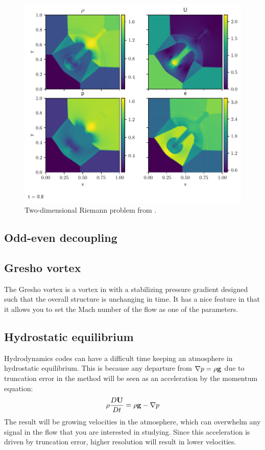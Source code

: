 \begin{figure}[t]
\centering
\includegraphics[width=0.85\linewidth]{quad}
\caption{\label{fig:Euler:quad} Two-dimensional Riemann problem
from \cite{hydro_test_quad}.}
\end{figure}

\ifdefined \debugmode
\subsection{Odd-even decoupling}

\subsection{Gresho vortex}

The Gresho vortex is a vortex in with a stabilizing pressure gradient
designed such that the overall structure is unchanging in time.  It
has a nice feature in that it allows you to set the Mach number of
the flow as one of the parameters.


\subsection{Hydrostatic equilibrium}

Hydrodynamics codes can have a difficult time keeping an atmosphere in
hydrostatic equilibrium.  This is because any departure from $\nabla p
= \rho {\bf g}$ due to truncation error in the method will be seen as an
acceleration by the momentum equation:
\begin{equation}
\rho {\frac{{D{\bf U}}}{D t}} = \rho {\bf g} - \nabla p
\end{equation}
The result will be growing velocities in the atmosphere, which can
overwhelm any signal in the flow that you are interested in studying.
Since this acceleration is driven by truncation error, higher
resolution will result in lower velocities.

